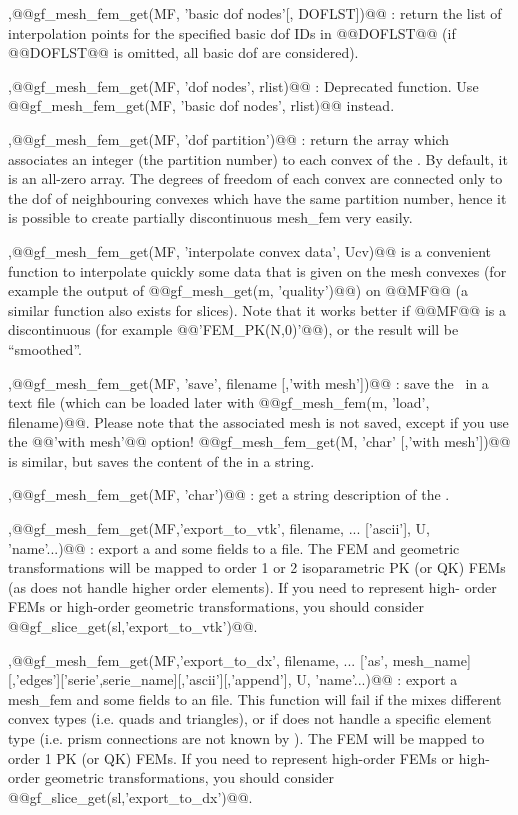 \begin{cmddescription}
  \sep{@@gf\_mesh\_fem\_get(MF, 'basic dof nodes'[, DOFLST])@@} : return the
  list of interpolation points for the specified basic dof IDs in @@DOFLST@@
  (if @@DOFLST@@ is omitted, all basic dof are considered).

  \sep{@@gf\_mesh\_fem\_get(MF, 'dof nodes', rlist)@@} : Deprecated
  function. Use @@gf\_mesh\_fem\_get(MF, 'basic dof nodes', rlist)@@ instead.

  \sep{@@gf\_mesh\_fem\_get(MF, 'dof partition')@@} : return the array
  which associates an integer (the partition number) to each convex of
  the \tmf. By default, it is an all-zero array.  The degrees of
  freedom of each convex are connected only to the dof of neighbouring
  convexes which have the same partition number, hence it is possible
  to create partially discontinuous mesh_fem very easily.


  \sep{@@gf\_mesh\_fem\_get(MF, 'interpolate convex data', Ucv)@@} is a
  convenient function to interpolate quickly some data that is given
  on the mesh convexes (for example the output of @@gf\_mesh\_get(m,
  'quality')@@) on @@MF@@ (a similar function also exists for slices).
  Note that it works better if @@MF@@ is a discontinuous \tmf (for
  example @@'FEM_PK(N,0)'@@), or the result will be ``smoothed''.

  
  \sep{@@gf\_mesh\_fem\_get(MF, 'save', filename [,'with mesh'])@@} : save the \tmf\ in a
  text file (which can be loaded later with @@gf\_mesh\_fem(m, 'load',
  filename)@@. Please note that the associated mesh is not saved, except if you
  use the @@'with mesh'@@ option! @@gf_mesh_fem_get(M, 'char' [,'with mesh'])@@
  is similar, but saves the content of the \tmf in a string.

  \sep{@@gf_mesh_fem_get(MF, 'char')@@} : get a string description of the \tmf.

  \sep{@@gf\_mesh\_fem\_get(MF,'export_to_vtk', filename, ... ['ascii'], U, 'name'...)@@} : 
  export a \tmf and some fields to a \VTK file.  The FEM and geometric
    transformations will be mapped to order 1 or 2 isoparametric PK (or QK) FEMs
    (as \VTK does not handle higher order elements). If you need to represent high-
    order FEMs or high-order geometric transformations, you should consider
    @@gf_slice_get(sl,'export_to_vtk')@@.

    \sep{@@gf_mesh_fem_get(MF,'export_to_dx', filename, ... ['as', mesh_name][,'edges']['serie',serie_name][,'ascii'][,'append'], U, 'name'...)@@} :
    export a mesh_fem and some fields to an \OpenDX file.  This function will fail
    if the \tmf mixes different convex types (i.e. quads and triangles), or
    if \OpenDX does not handle a specific element type (i.e. prism connections are
    not known by \OpenDX).  The FEM will be mapped to order 1 PK (or QK) FEMs. If
    you need to represent high-order FEMs or high-order geometric transformations,
    you should consider @@gf_slice_get(sl,'export_to_dx')@@.



\end{cmddescription}
